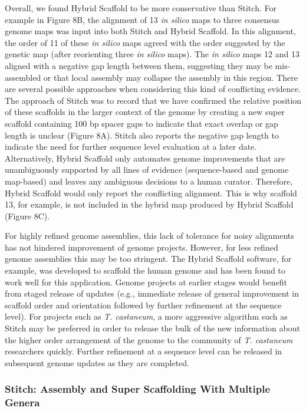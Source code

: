 \documentclass{bmcart}
\begin{document}
Overall, we found Hybrid Scaffold to be more conservative than Stitch. For example in Figure 8B, the alignment of 13 \textit{in silico} maps to three consensus genome maps was input into both Stitch and Hybrid Scaffold. In this alignment, the order of 11 of these \textit{in silico} maps agreed with the order suggested by the genetic map (after reorienting three \textit{in silico} maps). The \textit{in silico} maps 12 and 13 aligned with a negative gap length between them, suggesting they may be mis-assembled or that local assembly may collapse the assembly in this region. There are several possible approaches when considering this kind of conflicting evidence. The approach of Stitch was to record that we have confirmed the relative position of these scaffolds in the larger context of the genome by creating a new super scaffold containing 100 bp spacer gaps to indicate that exact overlap or gap length is unclear (Figure 8A). Stitch also reports the negative gap length to indicate the need for further sequence level evaluation at a later date. Alternatively, Hybrid Scaffold only automates genome improvements that are unambiguously supported by all lines of evidence (sequence-based and genome map-based) and leaves any ambiguous decisions to a human curator. Therefore, Hybrid Scaffold would only report the conflicting alignment. This is why scaffold 13, for example, is not included in the hybrid map produced by Hybrid Scaffold (Figure 8C). 


For highly refined genome assemblies, this lack of tolerance for noisy alignments has not hindered improvement of genome projects. However, for less refined genome assemblies this may be too stringent. The Hybrid Scaffold software, for example, was developed to scaffold the human genome and has been found to work well for this application. Genome projects at earlier stages would benefit from staged release of updates (e.g., immediate release of general improvement in scaffold order and orientation followed by further refinement at the sequence level). For projects such as \textit{T. castaneum}, a more aggressive algorithm such as Stitch may be preferred in order to release the bulk of the new information about the higher order arrangement of the genome to the community of \textit{T. castaneum} researchers quickly. Further refinement at a sequence level can be released in subsequent genome updates as they are completed.

\subsubsection*{Stitch: Assembly and Super Scaffolding With Multiple Genera}
\end{document}
